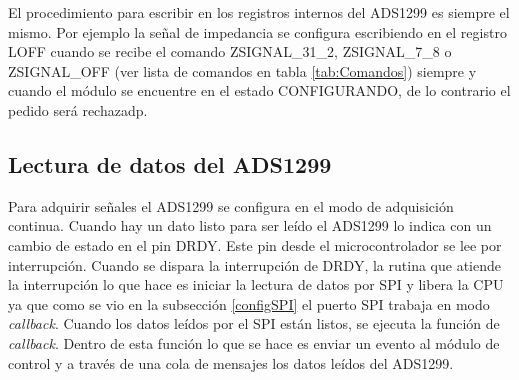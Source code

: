 El procedimiento para escribir en los registros internos del ADS1299 es siempre el mismo. Por ejemplo la señal de impedancia se configura escribiendo en el registro LOFF cuando se recibe el comando ZSIGNAL\_31\_2, ZSIGNAL\_7\_8 o ZSIGNAL\_OFF (ver lista de comandos en tabla \ref{tab:Comandos}) siempre y cuando el módulo se encuentre en el estado CONFIGURANDO, de lo contrario el pedido será rechazadp.

\subsection{Lectura de datos del ADS1299}

Para adquirir señales el ADS1299 se configura en el modo de adquisición continua. Cuando hay un dato listo para ser leído el ADS1299 lo indica con un cambio de estado en el pin DRDY. Este pin desde el microcontrolador se lee por interrupción. Cuando se dispara la interrupción de DRDY, la rutina que atiende la interrupción lo que hace es iniciar la lectura de datos por SPI y libera la CPU ya que como se vio en la subsección \ref{configSPI} el puerto SPI trabaja en modo \textit{callback}. Cuando los datos leídos por el SPI están listos, se ejecuta la función de \textit{callback}. Dentro de esta función lo que se hace es enviar un evento al módulo de control y a través de una cola de mensajes los datos leídos del ADS1299.
%
%
%
%


